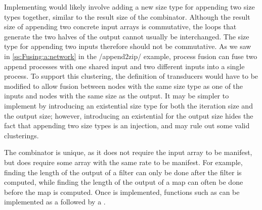 Implementing \Hs@append@ would likely involve adding a new size type for appending two size types together, similar to the result size of the \Hs@cross@ combinator.
Although the result size of appending two concrete input arrays is commutative, the loops that generate the two halves of the output cannot usually be interchanged.
The size type for appending two inputs therefore should not be commutative.
As we saw in \cref{ss:Fusing:a:network} in the \Hs/append2zip/ example, process fusion can fuse two append processes with one shared input and two different inputs into a single process.
To support this clustering, the definition of transducers would have to be modified to allow fusion between nodes with the same size type as one of the inputs and nodes with the same size as the output.
It may be simpler to implement \Hs@append@ by introducing an existential size type for both the iteration size and the output size; however, introducing an existential for the output size hides the fact that appending two size types is an injection, and may rule out some valid clusterings.

The \Hs@length@ combinator is unique, as it does not require the input array to be manifest, but does require some array with the same rate to be manifest.
For example, finding the length of the output of a filter can only be done after the filter is computed, while finding the length of the output of a map can often be done before the map is computed.
Once \Hs@length@ is implemented, functions such as \Hs@reverse@ can be implemented as a \Hs@generate@ followed by a \Hs@gather@.

% 
 
